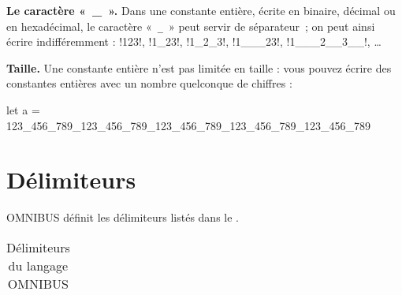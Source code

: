 \textbf{Le caractère «~\_~».} Dans une constante entière, écrite en binaire, décimal ou en hexadécimal, le caractère «~\texttt{\_}~» peut servir de séparateur~; on peut ainsi écrire indifféremment : \omnibus!123!, \omnibus!1_23!, \omnibus!1_2_3!, \omnibus!1___23!, \omnibus!1___2__3__!, \dots

\textbf{Taille.} Une constante entière n'est pas limitée en taille : vous pouvez écrire des constantes entières avec un nombre quelconque de chiffres :

\begin{OMNIBUS}
let a = 123_456_789_123_456_789_123_456_789_123_456_789_123_456_789
\end{OMNIBUS}





\section{Délimiteurs}

OMNIBUS définit les délimiteurs listés dans le .

\begin{table}[htbp]
  \centering
  \begin{tabular}{llllllllllllll}
    
  \end{tabular}
  \caption{Délimiteurs du langage OMNIBUS}
\end{table}











